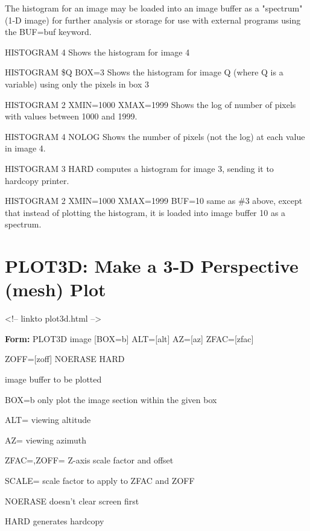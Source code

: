 The histogram for an image may be loaded into an image buffer as a
"spectrum" (1-D image) for further analysis or storage for use with
external programs using the BUF=buf keyword.

\begin{example}
  \item[HISTOGRAM 4 \hfill]{Shows the histogram for image 4}
  \item[HISTOGRAM \$Q BOX=3 \hfill]{Shows the histogram for image Q 
       (where Q is a variable) using only the pixels in box 3}
  \item[HISTOGRAM 2 XMIN=1000 XMAX=1999 \hfill]{
       Shows the log of number of pixels with values between 1000 and 1999.}
  \item[HISTOGRAM 4 NOLOG \hfill]{
       Shows the number of pixels (not the log) at each value in image 4.}
  \item[HISTOGRAM 3 HARD\hfill]{
       computes a histogram for image 3, sending it to hardcopy printer.}
  \item[HISTOGRAM 2 XMIN=1000 XMAX=1999 BUF=10\hfill]{ same as \#3 above,
       except that instead of plotting the histogram, it is loaded into image
       buffer 10 as a spectrum.}
\end{example}

\section{PLOT3D: Make a 3-D Perspective (mesh) Plot}
\begin{rawhtml}
<!-- linkto plot3d.html -->
\end{rawhtml}
\begin{command}
  \item[\textbf{Form: }PLOT3D image {[BOX=b]} ALT={[alt]} AZ={[az]} 
   ZFAC={[zfac]}\hfill]{}
  \item{ZOFF={[zoff]} NOERASE HARD}
  \item[image]{buffer to be plotted}
  \item[BOX=b]{only plot the image section within the given box}
  \item[ALT=]{viewing altitude}
  \item[AZ=]{viewing azimuth}
  \item[ZFAC=,ZOFF=]{Z-axis scale factor and offset}
  \item[SCALE=]{scale factor to apply to ZFAC and ZOFF}
  \item[NOERASE]{doesn't clear screen first}
  \item[HARD]{generates hardcopy}
\end{command}

